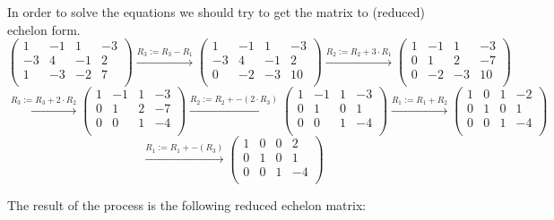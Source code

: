 \documentclass[a4paper]{article}
\begin{document}
In order to solve the equations we should try to get the matrix to (reduced) echelon form.
\[
\left(
\begin{array}{ccc|c}
1 & -1 & 1 & -3   \\
-3 & 4 & -1 & 2  \\
1 & -3 & -2 & 7   \\
\end{array}
\right)
\xrightarrow{\text{$R_3 := R_3 - R_1$}}
\left(
\begin{array}{ccc|c}
1 & -1 & 1 & -3   \\
-3 & 4 & -1 & 2  \\
0 & -2 & -3 & 10   \\
\end{array}
\right)
\xrightarrow{\text{$R_2 := R_2 + 3 \cdot R_1$}}
\left(
\begin{array}{ccc|c}
1 & -1 & 1 & -3   \\
0 & 1 & 2 & -7  \\
0 & -2 & -3 & 10   \\
\end{array}
\right)
\]
\[
\xrightarrow{\text{$R_3 := R_3 + 2 \cdot R_2$}}
\left(
\begin{array}{ccc|c}
1 & -1 & 1 & -3   \\
0 & 1 & 2 & -7  \\
0 & 0 & 1 & -4   \\
\end{array}
\right)
\xrightarrow{\text{$R_2 := R_2 + -(2 \cdot R_3)$}}
\left(
\begin{array}{ccc|c}
1 & -1 & 1 & -3   \\
0 & 1 & 0 & 1 \\
0 & 0 & 1 & -4   \\
\end{array}
\right)
\xrightarrow{\text{$R_1 := R_1 + R_2$}}
\left(
\begin{array}{ccc|c}
1 & 0 & 1 & -2   \\
0 & 1 & 0 & 1 \\
0 & 0 & 1 & -4   \\
\end{array}
\right)
\]
\[
\xrightarrow{\text{$R_1 := R_1 + -(R_3)$}}
\left(
\begin{array}{ccc|c}
1 & 0 & 0 & 2   \\
0 & 1 & 0 & 1 \\
0 & 0 & 1 & -4   \\
\end{array}
\right)
\]

The result of the process is the following reduced echelon matrix:
\end{document}
